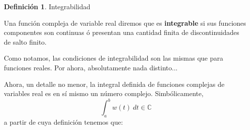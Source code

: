 \documentclass[12pt]{article}
\theoremstyle{definition}
\newtheorem{definition}{Definici\'on}[section]
\theoremstyle{theorem}
\theoremstyle{corolary}
\begin{document}
\colorbox{orange!40!white!80}{\parbox{\linewidth}{
\theoremstyle{theorem}
\begin{definition} {Integrabilidad}

Una funci\'on compleja de variable real diremos que es \textbf{integrable} si sus funciones componentes son continuas \'o presentan una cantidad finita de discontinuidades de salto finito.

\end{definition}}}
\linebreak
\linebreak

Como notamos, las condiciones de integrabilidad son las mismas que para funciones reales. Por ahora, absolutamente nada distinto...	

Ahora, un detalle no menor, la integral definida de funciones complejas de variables real es en s\'i mismo un n\'umero complejo. Simb\'olicamente, $$\int_a^bw(t)\ dt \in \mathbb{C}$$
a partir de cuya definici\'on tenemos que:
\end{document}
